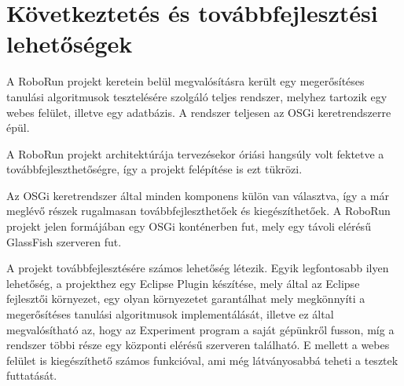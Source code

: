 \chapter{Következtetés és továbbfejlesztési lehetőségek}\label{ch:KOVETKEZTETESEK}

A RoboRun projekt keretein belül megvalósításra került egy megerősítéses tanulási algoritmusok tesztelésére szolgáló teljes rendszer, melyhez tartozik egy webes felület, illetve egy adatbázis. A rendszer teljesen az OSGi keretrendszerre épül.

A RoboRun projekt architektúrája tervezésekor óriási hangsúly volt fektetve a továbbfejleszthetőségre, így a projekt felépítése is ezt tükrözi.

Az OSGi keretrendszer által minden komponens külön van választva, így a már meglévő részek rugalmasan továbbfejleszthetőek és kiegészíthetőek. A RoboRun projekt jelen formájában egy OSGi konténerben fut, mely egy távoli elérésű GlassFish szerveren fut.

A projekt továbbfejlesztésére számos lehetőség létezik. Egyik legfontosabb ilyen lehetőség, a projekthez egy Eclipse Plugin\cite{eclipseplugin} készítése, mely által az Eclipse fejlesztői környezet, egy olyan környezetet garantálhat mely megkönnyíti a megerősítéses tanulási algoritmusok implementálását, illetve ez által megvalósítható az, hogy az Experiment program a saját gépünkről fusson, míg a rendszer többi része egy központi elérésű szerveren található.
E mellett a webes felület is kiegészíthető számos funkcióval, ami még látványosabbá teheti a tesztek futtatását.

